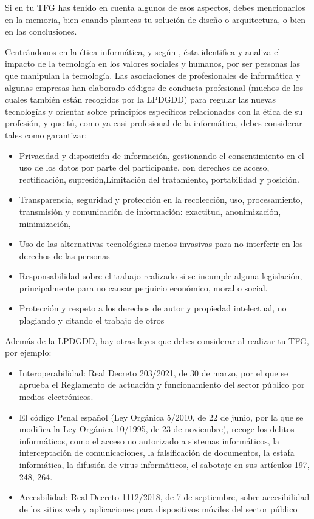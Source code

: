 Si en tu TFG has tenido en cuenta algunos de esos aspectos, debes mencionarlos en la memoria, bien cuando planteas tu solución de diseño o arquitectura, o bien en las conclusiones.

Centrándonos en la ética informática, y según \cite{bynum2000}, ésta identifica y analiza el impacto de la tecnología en los valores sociales y humanos, por ser personas las que manipulan la tecnología. Las asociaciones de profesionales de informática y algunas empresas han elaborado códigos de conducta profesional (muchos de los cuales también están recogidos por la LPDGDD) para regular las nuevas tecnologías y orientar sobre principios específicos relacionados con la ética de su profesión, y que tú, como ya casi profesional de la informática, debes considerar tales como garantizar:  
\begin{itemize}
    \item Privacidad y disposición de información, gestionando el consentimiento en el uso de los datos por parte del participante, con derechos de acceso, rectificación, supresión,Limitación del tratamiento, portabilidad y posición.
    \item Transparencia, seguridad y protección en la recolección, uso, procesamiento, transmisión y comunicación de información: exactitud, anonimización, minimización, 
    \item Uso de las alternativas tecnológicas menos invasivas para no interferir en los derechos de las personas
    \item Responsabilidad sobre el trabajo realizado si se incumple alguna legislación, principalmente para no causar perjuicio económico, moral o social.
    \item Protección y respeto a los derechos de autor y propiedad intelectual, no plagiando y citando el trabajo de otros
\end{itemize}


Además de la LPDGDD, hay otras leyes que debes considerar al realizar tu TFG, por ejemplo:
 
\begin{itemize}
    \item Interoperabilidad: Real Decreto 203/2021, de 30 de marzo, por el que se aprueba el Reglamento de actuación y funcionamiento del sector público por medios electrónicos.
    \item El código Penal español (Ley Orgánica 5/2010, de 22 de junio, por la que se modifica la Ley Orgánica 10/1995, de 23 de noviembre), recoge los delitos informáticos, como el acceso no autorizado a sistemas informáticos, la interceptación de comunicaciones, la falsificación de documentos, la estafa informática, la difusión de virus informáticos, el sabotaje en sus artículos 197, 248, 264.
    \item Accesbilidad: Real Decreto 1112/2018, de 7 de septiembre, sobre accesibilidad de los sitios web y aplicaciones para dispositivos móviles del sector público
\end{itemize}

